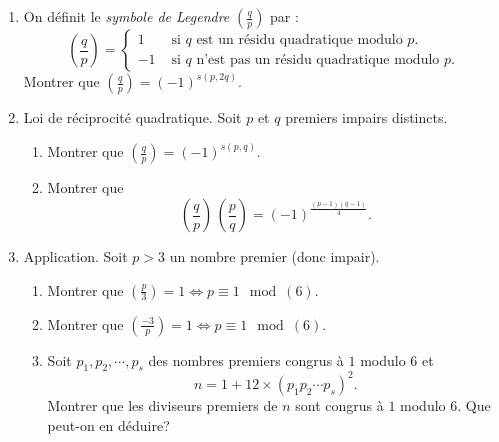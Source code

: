 \begin{enumerate}
  \item On définit le \emph{symbole de Legendre} $\left( \frac{q}{p} \right)$ par :
\[
  \left( \frac{q}{p} \right) =
  \left\lbrace
  \begin{aligned}
    1 &\text{ si } q \text{ est un résidu quadratique modulo } p. \\
    -1 &\text{ si } q \text{ n'est pas un résidu quadratique modulo } p.
  \end{aligned}
  \right.
\]
   Montrer que $\left( \frac{q}{p} \right) = (-1)^{s(p,2q)}$.
  \item Loi de réciprocité quadratique. Soit $p$ et $q$ premiers impairs distincts.
  \begin{enumerate}
    \item Montrer que $\left( \frac{q}{p} \right) = (-1)^{s(p,q)}$.
    \item Montrer que 
\[
  \left( \frac{q}{p} \right)\, \left( \frac{p}{q} \right) = (-1)^{\frac{(p-1)(q-1)}{4}}.
\]
  \end{enumerate}

  \item Application. Soit $p>3$ un nombre premier (donc impair).
  \begin{enumerate}
    \item Montrer que $\left( \frac{p}{3} \right) = 1 \Leftrightarrow p \equiv 1 \mod(6)$.
    \item Montrer que $\left( \frac{-3}{p} \right) = 1 \Leftrightarrow p \equiv 1 \mod(6)$.
    \item Soit $p_1, p_2, \cdots, p_s$ des nombres premiers congrus à $1$ modulo 6 et
\[
  n = 1 + 12\times(p_1 p_2 \cdots p_s)^2.
\]
    Montrer que les diviseurs premiers de $n$ sont congrus à $1$ modulo 6. Que peut-on en déduire?
  \end{enumerate}

\end{enumerate}
